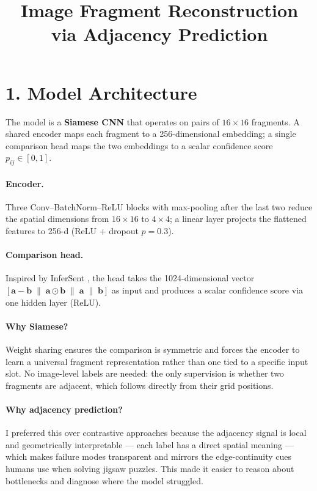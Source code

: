 \documentclass[10pt, a4paper, twocolumn]{article}
\title{\textbf{Image Fragment Reconstruction via Adjacency Prediction}}
\author{}
\date{}
\begin{document}
\maketitle
\thispagestyle{empty}

\section*{1. Model Architecture}

The model is a \textbf{Siamese CNN} that operates on pairs of $16{\times}16$
fragments. A shared encoder maps each fragment to a 256-dimensional embedding;
a single comparison head maps the two embeddings to a scalar confidence score
$p_{ij} \in [0,1]$.

\paragraph{Encoder.}
Three Conv--BatchNorm--ReLU blocks with max-pooling after the last two reduce
the spatial dimensions from $16{\times}16$ to $4{\times}4$; a linear layer
projects the flattened features to 256-d (ReLU + dropout $p=0.3$).

\paragraph{Comparison head.}
Inspired by InferSent \cite{infersent2017}, the head takes the
1024-dimensional vector
$[\mathbf{a}-\mathbf{b}\;\|\;\mathbf{a}\odot\mathbf{b}\;\|\;\mathbf{a}\;\|\;\mathbf{b}]$
as input and produces a scalar confidence score via one hidden layer (ReLU).

\paragraph{Why Siamese?}
Weight sharing ensures the comparison is symmetric and forces the encoder to
learn a universal fragment representation rather than one tied to a specific
input slot. No image-level labels are needed: the only supervision is whether two
fragments are adjacent, which follows directly from their grid positions.

\paragraph{Why adjacency prediction?}
I preferred this over contrastive approaches because the adjacency signal is
local and geometrically interpretable --- each label has a direct spatial
meaning --- which makes failure modes transparent and mirrors the edge-continuity
cues humans use when solving jigsaw puzzles. This made it easier to reason about
bottlenecks and diagnose where the model struggled.
\end{document}
